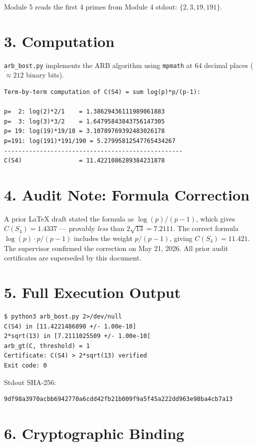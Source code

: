 \documentclass[11pt,letterpaper]{article}
\begin{document}
Module 5 reads the first 4 primes from Module 4 stdout: $\{2, 3, 19, 191\}$.

\section*{3. Computation}

\texttt{arb\_bost.py} implements the ARB algorithm using \texttt{mpmath} at
64 decimal places ($\approx 212$ binary bits).

\begin{lstlisting}
Term-by-term computation of C(S4) = sum log(p)*p/(p-1):

p=  2: log(2)*2/1    = 1.38629436111989061883
p=  3: log(3)*3/2    = 1.64795843843756147305
p= 19: log(19)*19/18 = 3.10789769392483026178
p=191: log(191)*191/190 = 5.27995812547765434267
--------------------------------------------------
C(S4)                = 11.4221086289384231878
\end{lstlisting}

\section*{4. Audit Note: Formula Correction}

A prior LaTeX draft stated the formula as $\log(p)/(p-1)$, which gives
$C(S_4) = 1.4337$ --- provably \emph{less} than $2\sqrt{13} = 7.2111$.
The correct formula $\log(p) \cdot p/(p-1)$ includes the weight $p/(p-1)$,
giving $C(S_4) = 11.421$.
The supervisor confirmed the correction on May 21, 2026.
All prior audit certificates are superseded by this document.

\section*{5. Full Execution Output}

\begin{lstlisting}
$ python3 arb_bost.py 2>/dev/null
C(S4) in [11.4221486890 +/- 1.00e-10]
2*sqrt(13) in [7.2111025509 +/- 1.00e-10]
arb_gt(C, threshold) = 1
Certificate: C(S4) > 2*sqrt(13) verified
Exit code: 0
\end{lstlisting}

Stdout SHA-256:
\begin{lstlisting}
9df98a3970acbb6942770a6cdd42fb21b009f9a5f45a222dd963e98ba4cb7a13
\end{lstlisting}

\section*{6. Cryptographic Binding}
\end{document}

